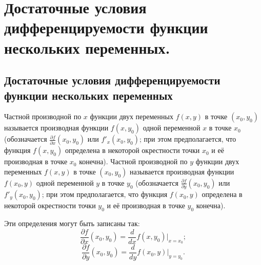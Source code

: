 \chapter[\texorpdfstring{Достаточные условия дифференцируемости функции не\-скольких переменных.}{Достаточные условия дифференцируемости функции нескольких переменных}]{Достаточные условия дифференцируемости функции нескольких переменных.}
\section[\texorpdfstring{Достаточные условия дифференцируемости функции \\несколь\-ких переменных.}{Достаточные условия дифференцируемости функции нескольких переменных}]{Достаточные условия дифференцируемости функции нескольких переменных}


\begin{defn} \label{df10:1}
Частной производной по $x$ функции двух переменных $f(x, y)$ в точке $(x_0, y_0)$ называется производная функции $f(x, y_0)$ одной переменной $x$ в точке $x_0$ (обозначается $\frac{\partial f}{\partial x}(x_0, y_0)$ или $f'_x(x_0, y_0)$; при этом предполагается, что функция $f(x, y_0)$ определена в некоторой окрестности точки $x_0$ и её производная в точке $x_0$ конечна). Частной производной по $y$ функции двух переменных $f(x, y)$ в точке $(x_0, y_0)$ называется производная функции $f(x_0, y)$ одной переменной $y$ в точке $y_0$ (обозначается $\frac{\partial f}{\partial y}(x_0, y_0)$ или $f'_y(x_0, y_0)$; при этом предполагается, что функция $f(x_0, y)$ определена в некоторой окрестности точки $y_0$ и её производная в точке $y_0$ конечна).

Эти определения могут быть записаны так:
$$
\frac{\partial f}{\partial x}(x_0, y_0) = \frac{d}{dx} f(x, y_0) \bigg|_{x=x_0};
$$
$$
\frac{\partial f}{\partial y}(x_0, y_0) = \frac{d}{dy} f(x_0, y) \bigg|_{y=y_0}.
$$
\end{defn}


